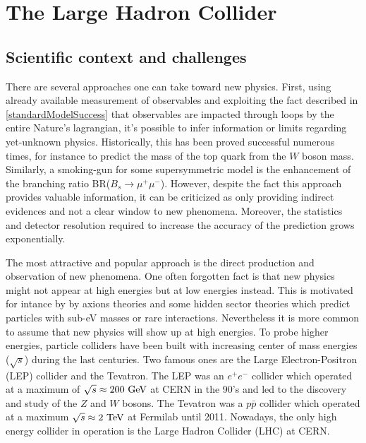 

    \section{The Large Hadron Collider}

    \subsection{Scientific context and challenges}

    There are several approaches one can take toward new physics. First, using already
    available measurement of observables and exploiting the fact described in \ref{standardModelSuccess}
    that observables are impacted through loops by the entire Nature's lagrangian,
    it's possible to infer information or limits regarding yet-unknown physics. Historically,
    this has been proved successful numerous times, for instance to predict the
    mass of the top quark from the $W$ boson mass. Similarly, a smoking-gun for some
    supersymmetric model is the enhancement of the branching ratio BR($B_s \rightarrow \mu^+\mu^-$).
    However, despite the fact this approach provides valuable information, it can
    be criticized as only providing indirect evidences and not a clear window to new phenomena.
    Moreover, the statistics and detector resolution required to increase the accuracy
    of the prediction grows exponentially.

    The most attractive and popular approach is the direct production and observation of
    new phenomena. One often forgotten fact is that new physics might not appear at high
    energies but at low energies instead. This is motivated for intance by by axions
    theories and some hidden sector theories which predict particles with sub-eV masses
    or rare interactions. Nevertheless it is more common to assume that new physics will
    show up at high energies. To probe higher energies, particle colliders have been
    built with increasing center of mass energies ($\sqrt{s}$) during the last centuries.
    Two famous ones are the Large Electron-Positron (LEP) collider and the Tevatron. The
    LEP was an $e^+e^-$ collider which operated at a maximum of $\sqrt{s} \approx 200~\text{GeV}$
    at CERN in the 90's and led to the discovery and study of the $Z$ and $W$ bosons. The
    Tevatron was a $p\bar{p}$ collider which operated at a maximum $\sqrt{s} \approx 2~\text{TeV}$
    at Fermilab until 2011. Nowadays, the only high energy collider in operation is the
    Large Hadron Collider (LHC) at CERN.

